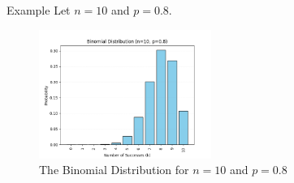 \documentclass{beamer}
\begin{document}
\begin{frame}{Example}
    Let \(n=10\) and \(p=0.8\). \pause
    \begin{figure}
        \centering
        \includegraphics[width=0.5\textwidth]{Figures/Figure_3.png}
        \caption{The Binomial Distribution for \(n=10\) and \(p=0.8\)}
        \label{fig:binomial}
    \end{figure}
\end{frame}
\end{document}
